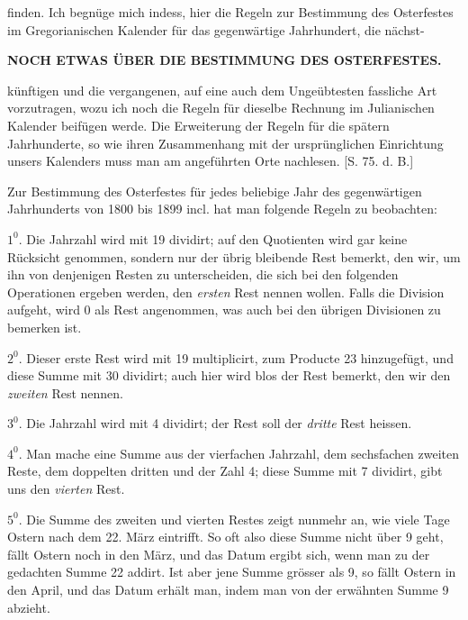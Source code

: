 finden. Ich begnüge mich indess, hier die Regeln zur Bestimmung des Osterfestes
im Gregorianischen Kalender für das gegenwärtige Jahrhundert, die nächst-
\par\clearpage
\thispagestyle{empty}
\noindent{}%
\makebox[12mm][l]{}%
\parbox[t]{\dimexpr\linewidth-24mm\relax}{\centering\fontsize{8.2}{10}\selectfont\bfseries NOCH ETWAS ÜBER DIE BESTIMMUNG DES OSTERFESTES.\par}%
\par\nobreak\medskip
\fontsize{10.7}{13}\selectfont
\noindent künftigen und die vergangenen, auf eine auch dem Ungeübtesten fassliche Art
vorzutragen, wozu ich noch die Regeln für dieselbe Rechnung im Julianischen
Kalender beifügen werde. Die Erweiterung der Regeln für die spätern Jahrhunderte,
so wie ihren Zusammenhang mit der ursprünglichen Einrichtung unsers
Kalenders muss man am angeführten Orte nachlesen. [S. 75. d. B.]

Zur Bestimmung des Osterfestes für jedes beliebige Jahr des gegenwärtigen
Jahrhunderts von 1800 bis 1899 incl. hat man folgende Regeln zu beobachten:

$1^{0}$. Die Jahrzahl wird mit 19 dividirt; auf den Quotienten wird gar keine
Rücksicht genommen, sondern nur der übrig bleibende Rest bemerkt, den wir,
um ihn von denjenigen Resten zu unterscheiden, die sich bei den folgenden Operationen
ergeben werden, den \textit{ersten} Rest nennen wollen. Falls die Division
aufgeht, wird 0 als Rest angenommen, was auch bei den übrigen Divisionen
zu bemerken ist.

$2^{0}$. Dieser erste Rest wird mit 19 multiplicirt, zum Producte 23 hinzugefügt,
und diese Summe mit 30 dividirt; auch hier wird blos der Rest bemerkt,
den wir den \textit{zweiten} Rest nennen.

$3^{0}$. Die Jahrzahl wird mit 4 dividirt; der Rest soll der \textit{dritte} Rest heissen.

$4^{0}$. Man mache eine Summe aus der vierfachen Jahrzahl, dem sechsfachen
zweiten Reste, dem doppelten dritten und der Zahl 4; diese Summe mit 7 dividirt,
gibt uns den \textit{vierten} Rest.

$5^{0}$. Die Summe des zweiten und vierten Restes zeigt nunmehr an, wie
viele Tage Ostern nach dem 22. März eintrifft. So oft also diese Summe nicht
über 9 geht, fällt Ostern noch in den März, und das Datum ergibt sich, wenn
man zu der gedachten Summe 22 addirt. Ist aber jene Summe grösser als 9,
so fällt Ostern in den April, und das Datum erhält man, indem man von der
erwähnten Summe 9 abzieht.

